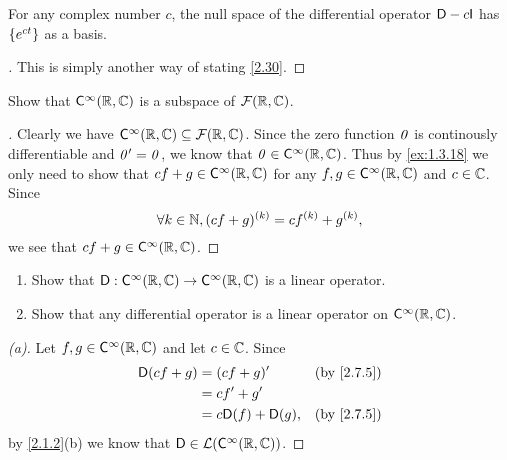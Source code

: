 \begin{cor}\label{2.7.10}
  For any complex number \(c\), the null space of the differential operator \(\Dop - c \IT\) has \(\left\lbrace e^{ct}\right\rbrace\) as a basis.
\end{cor}

\begin{proof}[]
  This is simply another way of stating \cref{2.30}.
\end{proof}

\exercisesection

\setcounter{ex}{4}
\begin{ex}\label{ex:2.7.5}
  Show that \(\cfs[\infty](\R, \C)\) is a subspace of \(\mathcal{F}(\mathbb{R}, \mathbb{C})\).
\end{ex}

\begin{proof}[]
  Clearly we have \(\cfs[\infty](\R, \C) \subseteq \fs(\R, \C)\).
  Since the zero function \(\mathit{0}\) is continously differentiable and \(\mathit{0}' = \mathit{0}\), we know that \(\zv \in \cfs[\infty](\R, \C)\).
  Thus by \cref{ex:1.3.18} we only need to show that \(cf + g \in \cfs[\infty](\R, \C)\) for any \(f, g \in \cfs[\infty](\R, \C)\) and \(c \in \mathbb{C}\).
  Since
  \[
    \forall k \in \mathbb{N}, (cf + g)^{(k)} = c f^{(k)} + g^{(k)},
  \]
  we see that \(cf + g \in \cfs[\infty](\R, \C)\).
\end{proof}

\begin{ex}\label{ex:2.7.6}
  \begin{enumerate}
    \item Show that \(\Dop : \cfs[\infty](\R, \C) \to \cfs[\infty](\R, \C)\) is a linear operator.
    \item Show that any differential operator is a linear operator on \(\cfs[\infty](\R, \C)\).
  \end{enumerate}
\end{ex}

\begin{proof}[(a)]
  Let \(f, g \in \cfs[\infty](\R, \C)\) and let \(c \in \mathbb{C}\).
  Since
  \begin{align*}
    \Dop(cf + g) & = (cf + g)'            &  & \text{(by \cref{2.7.5})} \\
                 & = c f' + g'                                          \\
                 & = c \Dop(f) + \Dop(g), &  & \text{(by \cref{2.7.5})}
  \end{align*}
  by \cref{2.1.2}(b) we know that \(\Dop \in \ls(\cfs[\infty](\R, \C))\).
\end{proof}


